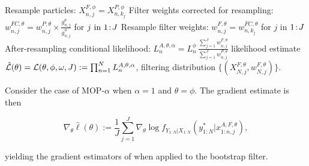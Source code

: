 \documentclass{article}
\begin{document}
\begin{algorithm}[ht]
\begin{algorithmic}[1]
            \STATE Resample particles: ${X}_{n,j}^{F,\phi}={X}_{n,k_{j}}^{P,\phi}$
            \STATE Filter weights corrected for resampling:
            $\displaystyle w^{FC,\theta}_{n,j}= w^{P,\theta}_{n,j} \times \frac{ g^{\theta}_{n,j}}{ g^{\phi}_{n,j}}$ for $j\ \mathrm{in}\ {1}\!:\!{J}$ \label{mop-alpha:weight:update}
            \STATE Resample filter weights:
            $w_{n,j}^{F,\theta}= {w}_{n,k_{j}}^{FC,\theta}$
            for $j$ in ${1}\!:\!{J}$ \label{mop-alpha:step2}
            \STATE After-resampling conditional likelihood: $\displaystyle L_n^{A,\theta,\alpha} = L_n^\phi \, \frac{\sum_{j=1}^J w^{F,\theta}_{n,j}}{\sum_{j=1}^J  w^{P,\theta}_{n,j}}$
            \ENDFOR
		\RETURN likelihood estimate $\hat{\mathcal{L}}(\theta) = \mathcal{L}(\theta, \phi, \omega, J) := \prod_{n=1}^N L_n^{A,\theta,\alpha}$, filtering distribution $\{(X_{N,j}^{F, \theta}, w^{F,\theta}_{N,j})\}.$
	\end{algorithmic}
\end{algorithm}

\begin{lem}
    \label{lem:mop-1-formula}
    Consider the case of MOP-$\alpha$ when $\alpha=1$ and $\theta=\phi$. The gradient estimate is then

    \begin{equation}
        \nabla_\theta \hat{\ell}(\theta) := \frac{1}{J}\sum_{j=1}^J \nabla_\theta \log f_{Y_{1:N}|X_{1:N}}\left(y_{1:N}^* | x_{1:n,j}^{A, F,\theta}\right),
    \end{equation}

    yielding the gradient estimators of \cite{poyiadjis11, scibior2021dpf} when applied to the bootstrap filter. 
\end{lem}
\end{document}
